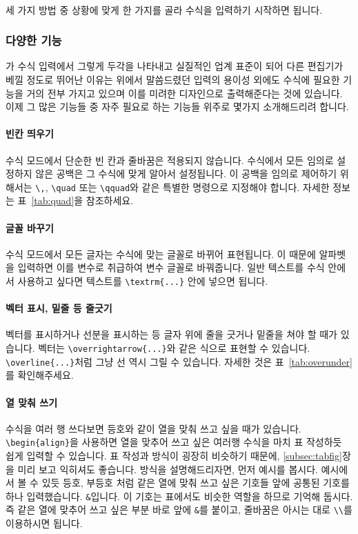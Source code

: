 \paragraph{}
세 가지 방법 중 상황에 맞게 한 가지를 골라 수식을 입력하기 시작하면 됩니다.

\subsubsection{다양한 기능}
\label{subsec:ams-func}
\lt 가 수식 입력에서 그렇게 두각을 나타내고 실질적인 업계 표준이 되어 다른 편집기가 베낄 정도로 뛰어난 이유는 위에서 말씀드렸던 입력의 용이성 외에도 수식에 필요한 기능을 거의 전부 가지고 있으며 이를 미려한 디자인으로 출력해준다는 것에 있습니다.
이제 그 많은 기능들 중 자주 필요로 하는 기능들 위주로 몇가지 소개해드리려 합니다.

\paragraph{빈칸 띄우기}
수식 모드에서 단순한 빈 칸과 줄바꿈은 적용되지 않습니다.
수식에서 모든 임의로 설정하지 않은 공백은 그 수식에 맞게 알아서 설정됩니다.
이 공백을 임의로 제어하기 위해서는  \verb|\,|, \verb|\quad| 또는 \verb|\qquad|와 같은 특별한 명령으로 지정해야 합니다.
자세한 정보는 표~\ref{tab:quad}을 참조하세요.

\paragraph{글꼴 바꾸기}
수식 모드에서 모든 글자는 수식에 맞는 글꼴로 바뀌어 표현됩니다.
이 때문에 알파벳을 입력하면 이를 변수로 취급하여 변수 글꼴로 바꿔줍니다.
일반 텍스트를 수식 안에서 사용하고 싶다면 텍스트를 \verb|\textrm{...}| 안에 넣으면 됩니다.

\paragraph{벡터 표시, 밑줄 등 줄긋기}
벡터를 표시하거나 선분을 표시하는 등 글자 위에 줄을 긋거나 밑줄을 쳐야 할 때가 있습니다.
벡터는 \verb|\overrightarrow{...}|와 같은 식으로 표현할 수 있습니다.
\verb|\overline{...}|처럼 그냥 선 역시 그릴 수 있습니다.
자세한 것은 표~\ref{tab:overunder}를 확인해주세요.

\paragraph{열 맞춰 쓰기}
수식을 여러 행 쓰다보면 등호와 같이 열을 맞춰 쓰고 싶을 때가 있습니다.
\verb|\begin{align}|을 사용하면 열을 맞추어 쓰고 싶은 여러행 수식을 마치 표 작성하듯 쉽게 입력할 수 있습니다.
표 작성과 방식이 굉장히 비슷하기 때문에, \ref{subsec:tabfig}장을 미리 보고 익히셔도 좋습니다.
방식을 설명해드리자면, 먼저 예시를 봅시다.
예시에서 볼 수 있듯 등호, 부등호 처럼 같은 열에 맞춰 쓰고 싶은 기호들 앞에 공통된 기호를 하나 입력했습니다.
\verb|&|입니다. 이 기호는 표에서도 비슷한 역할을 하므로 기억해 둡시다.
즉 같은 열에 맞추어 쓰고 싶은 부분 바로 앞에 \verb|&|를 붙이고, 줄바꿈은 아시는 대로 \verb|\\|를 이용하시면 됩니다.

